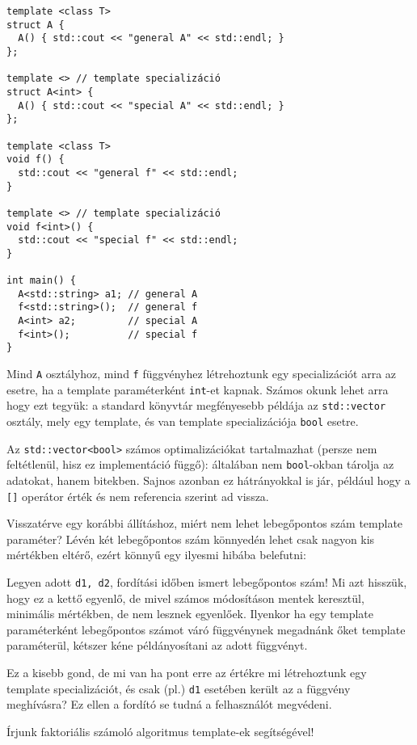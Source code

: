 \documentclass[../cpp_book/cpp_book.tex]{subfiles}
\begin{document}
	\begin{lstlisting}
template <class T>
struct A {
  A() { std::cout << "general A" << std::endl; }
};

template <> // template specializáció
struct A<int> {
  A() { std::cout << "special A" << std::endl; }
};

template <class T>
void f() {
  std::cout << "general f" << std::endl;
}

template <> // template specializáció
void f<int>() {
  std::cout << "special f" << std::endl;
}

int main() {
  A<std::string> a1; // general A
  f<std::string>();  // general f
  A<int> a2;         // special A
  f<int>();          // special f
}
	\end{lstlisting}
	Mind \texttt{A} osztályhoz, mind \texttt{f} függvényhez létrehoztunk egy specializációt arra az esetre, ha a template paraméterként \texttt{int}-et kapnak. Számos okunk lehet arra hogy ezt tegyük: a standard könyvtár megfényesebb példája az \texttt{std::vector} osztály, mely egy template, és van template specializációja \texttt{bool} esetre.
	\begin{note}
		Az \texttt{std::vector<bool>} számos optimalizációkat tartalmazhat (persze nem feltétlenül, hisz ez implementáció függő): általában nem \texttt{bool}-okban tárolja az adatokat, hanem bitekben. Sajnos azonban ez hátrányokkal is jár, például hogy a \texttt{[]} operátor érték és nem referencia szerint ad vissza.
	\end{note}
	\begin{note}
		Visszatérve egy korábbi állításhoz, miért nem lehet lebegőpontos szám template paraméter? Lévén két lebegőpontos szám könnyedén lehet csak nagyon kis mértékben eltérő, ezért könnyű egy ilyesmi hibába belefutni: 
		
		Legyen adott \texttt{d1, d2}, fordítási időben ismert lebegőpontos szám! Mi azt hisszük, hogy ez a kettő egyenlő, de mivel számos módosításon mentek keresztül, minimális mértékben, de nem lesznek egyenlőek. Ilyenkor ha egy template paraméterként lebegőpontos számot váró függvénynek megadnánk őket template paraméterül, kétszer kéne példányosítani az adott függvényt.
		
		Ez a kisebb gond, de mi van ha pont erre az értékre mi létrehoztunk egy template specializációt, és csak (pl.) \texttt{d1} esetében került az a függvény meghívásra? Ez ellen a fordító se tudná a felhasználót megvédeni.
	\end{note}
	Írjunk faktoriális számoló algoritmus template-ek segítségével!
\end{document}
